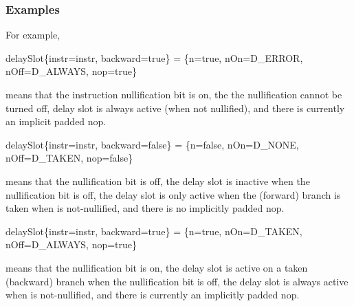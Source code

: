 \subsubsection{Examples}
  For example,
\begin{SML}
    delaySlot\{instr=instr, backward=true\} =
    \{n=true, nOn=D_ERROR, nOff=D_ALWAYS, nop=true\}
\end{SML}
\noindent means that the instruction nullification bit is on, the
the nullification cannot be turned off, delay slot is always active 
(when not nullified), and there is currently an implicit padded nop.

\begin{SML}
   delaySlot\{instr=instr, backward=false\} =
  \{n=false, nOn=D_NONE, nOff=D_TAKEN, nop=false\}
\end{SML}
\noindent means that the nullification bit is off, the delay slot
is inactive when the nullification bit is off,  the delay slot is only
active when the (forward) branch is taken when  is 
not-nullified, and there
is no implicitly padded nop.

\begin{SML}
   delaySlot\{instr=instr, backward=true\} =
  \{n=true, nOn=D_TAKEN, nOff=D_ALWAYS, nop=true\}
\end{SML}
\noindent means that the nullification bit is on, the delay slot
is active on a taken (backward) branch when the nullification bit is off, 
the delay slot is always active when  is not-nullified, 
and there is currently an implicitly padded nop.

